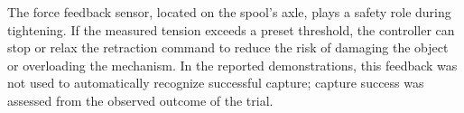 The force feedback sensor, located on the spool's axle, plays a safety role during tightening. If the measured tension exceeds a preset threshold, the controller can stop or relax the retraction command to reduce the risk of damaging the object or overloading the mechanism. In the reported demonstrations, this feedback was not used to automatically recognize successful capture; capture success was assessed from the observed outcome of the trial.
\let\cleardoublepage\clearpage
